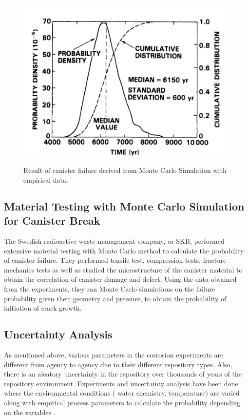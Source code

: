 \documentclass[12pt]{article}
\begin{document}
\begin{figure}[h]
\centering
\includegraphics[scale=0.5]{./images/canister.png}
\label{fig:can}
\caption{Result of canister failure derived from Monte Carlo Simulation
         with empirical data.}
\end{figure}


\subsection{Material Testing with Monte Carlo Simulation for Canister Break}
The Swedish radioactive waste management company, or \gls{SKB}, 
performed extensive material testing with Monte Carlo method
to calculate the probability of canister failure. They performed
tensile test, compression tests, fracture mechanics tests as well 
as studied the microstructure of the canister material to obtain
the correlation of canister damage and defect. Using the data 
obtained from the experiments, they ran Monte Carlo simulations
on the failure probability given their geometry and pressure, to
obtain the probability of initiation of crack growth. 

\subsection{Uncertainty Analysis}

As mentioned above, various parameters in the corrosion experiments
are different from agency to agency due to their different repository 
types. Also, there is an aleatory uncertainty in the repository over 
thousands of years of the repository environment. Experiments and 
uncertainty analysis have been done where the environmental
conditions ( water chemistry, temperature) are varied along with
empirical process parameters to calculate the probability depending 
on the variables \cite{sutcliffe_uncertainty_1984}.
\end{document}
